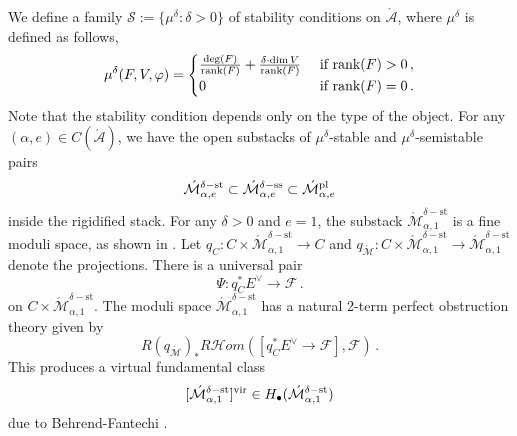 \documentclass[11pt]{amsart}
\theoremstyle{remark}
\newcommand{\Adash}{\acute{\mathcal{A}}}
\newcommand{\mF}[0]{\mathcal F}
\newcommand{\Mdash}{\acute{\mathcal{M}}}
\newcommand{\rk}{\textnormal{rank}}
\newcommand{\HOM}[0]{\mathscr{H}om}
\newcommand{\vp}[0]{\varphi}
\newcommand{\vir}[0]{\textnormal{vir}}
\newcommand{\pl}[0]{\textnormal{pl}}
\renewcommand{\ss}[0]{\text{ss}}
\newcommand{\st}[0]{\text{st}}
\numberwithin{theorem}{section}
\begin{document}
    \vspace{.5cm}
    We define a family $\mathscr S:= \{\mu^\delta: \delta>0\}$ of stability conditions on $\Adash$, where $\mu^\delta$ is defined as follows,
    \begin{equation}\label{stability definition}
        \mu^\delta(F,V,\vp) = 
        \begin{cases}
            \frac{\deg(F)}{\rk(F)} + \frac{\delta \cdot \dim V}{\rk(F)} & \textnormal{ if } \rk(F)>0\,,\\
            0 & \textnormal{ if } \rk(F)=0\,.
        \end{cases} 
        \end{equation}
    Note that the stability condition depends only on the type of the object.
    For any $(\alpha,e) \in C(\Adash)$, we have the open substacks of $\mu^\delta$-stable and $\mu^\delta$-semistable pairs
    $$\Mdash_{\alpha,e}^{\delta-\st} \subset \Mdash_{\alpha,e}^{\delta-\ss}
    \subset \Mdash^\pl_{\alpha,e}$$
    inside the rigidified stack.
    For any $\delta>0$ and $e=1$, the substack $\Mdash_{\alpha,1}^{\delta-\st}$ is a fine moduli space, as shown in \cite{Lin18}.
    Let $q_C: C \times \Mdash_{\alpha,1}^{\delta-\st} \to C$ 
    and $q_{\Mdash}: C \times \Mdash_{\alpha,1}^{\delta-\st} \to \Mdash_{\alpha,1}^{\delta-\st} $ denote the projections.
    There is a universal pair
    $$ \Psi: q_C^*E^\vee \to \mF\,. $$
    on $C \times \Mdash_{\alpha,1}^{\delta-\st}$.
    The moduli space $\Mdash_{\alpha,1}^{\delta-\st}$ has a natural 2-term perfect obstruction theory given by
    \begin{equation}\label{equation POT on stable pairs}
        R{(q_{\Mdash})}_* R\HOM([q_C^*E^\vee \to \mF], \mF)\,.
    \end{equation}
    This produces a virtual fundamental class $$[\Mdash_{\alpha,1}^{\delta-\st}]^\vir \in H_\bullet(\Mdash_{\alpha,1}^{\delta-\st})$$
    due to Behrend-Fantechi \cite{BF97}.
    
\end{document}

